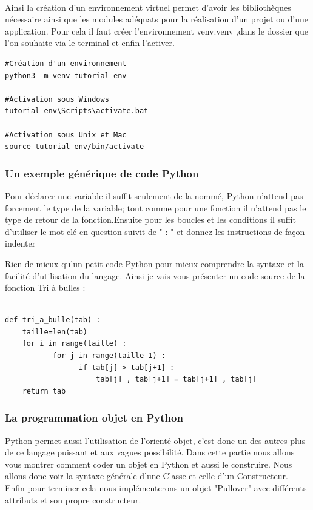 \documentclass[a4paper, 12pt, twoside]{article}
\begin{document}
\paragraph*{}{Ainsi la création d'un environnement virtuel permet d'avoir les bibliothèques nécessaire ainsi que les modules adéquats pour la réalisation d'un projet ou d'une application. Pour cela il faut créer l'environnement \textsf{venv.venv} ,dans le dossier que l'on souhaite via le terminal et enfin l'activer.}

\begin{verbatim}
#Création d'un environnement
python3 -m venv tutorial-env   

#Activation sous Windows
tutorial-env\Scripts\activate.bat

#Activation sous Unix et Mac
source tutorial-env/bin/activate
\end{verbatim}


\subsubsection{Un exemple générique de code Python}
Pour déclarer une variable il suffit seulement de la nommé, Python n'attend pas forcement le type de la variable; tout comme pour une fonction il n'attend pas le type de retour de la fonction.Ensuite pour les boucles et les conditions il suffit d'utiliser le mot clé en question suivit de " : " et donnez les instructions de façon indenter \newline

Rien de mieux qu'un petit code Python pour mieux comprendre la syntaxe et la facilité d'utilisation du langage. Ainsi je vais vous présenter un code source de la fonction \textsf{Tri à bulles} :

\begin{verbatim}

def tri_a_bulle(tab) :
    taille=len(tab)
    for i in range(taille) :
           for j in range(taille-1) : 
                 if tab[j] > tab[j+1] :
                     tab[j] , tab[j+1] = tab[j+1] , tab[j]
    return tab
\end{verbatim}

\subsubsection{La programmation objet en Python}
Python permet aussi l'utilisation de l'orienté objet, c'est donc un des autres plus de ce langage puissant et aux vagues possibilité. Dans cette partie nous allons vous montrer comment coder un objet en Python et aussi le construire. Nous allons donc voir la syntaxe générale d'une  \textsf{Classe} et celle d'un \textsf{Constructeur}. Enfin pour terminer cela nous implémenterons un objet "Pullover" avec différents attributs et son propre constructeur.
\end{document}
